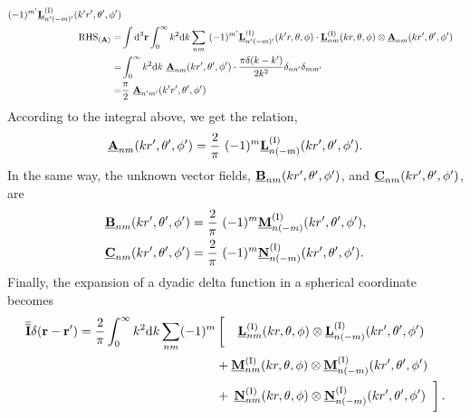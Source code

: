 \documentclass[journal=jacsat,manuscript=article,layout=traditional]{achemso}
\newcommand*\tensori{\overline{\overline{\mathbf{I}}}}
\newcommand{\norF}[1]{\underline{\vb{#1}}}
\newcommand{\RomanI}{\scriptsize\textrm{I}}
\begin{document}
\begin{appendix}
\begin{align}
    (-1)^{m'}\norF{L}_{n'(-m)'}^{(\RomanI)}(k'r',\theta',\phi')\\
    \nonumber
    \mathrm{RHS}_{(\vb{A})}=&\int\mathrm{d}^3\vb{r}\int_0^\infty k^2\mathrm{d}k \sum_{nm}~
    (-1)^{m'}\norF{L}_{n'(-m)'}^{(\RomanI)}(k'r,\theta,\phi)\cdot
    \norF{L}_{nm}^{(\RomanI)}(kr,\theta,\phi)
    \otimes\norF{A}_{nm}(kr',\theta',\phi')\\
    \nonumber
    =&\int_0^\infty k^2\mathrm{d}k~
    \norF{A}_{nm}(kr',\theta',\phi')\cdot \frac{\pi\delta(k-k')}{2k^2}\delta_{nn'}\delta_{mm'}\\
    =&\frac{\pi}{2}~\norF{A}_{n'm'}(k'r',\theta',\phi')
\end{align}
According to the integral above, we get the relation,
\begin{align}
    \norF{A}_{nm}(kr',\theta',\phi') = \frac{2}{\pi}~(-1)^{m}\norF{L}_{n(-m)}^{(\RomanI)}(kr',\theta',\phi').
\end{align}
In the same way, the unknown vector fields, $\norF{B}_{nm}(kr',\theta',\phi')$, and $\norF{C}_{nm}(kr',\theta',\phi')$, are
\begin{align}
    \norF{B}_{nm}(kr',\theta',\phi') &= \frac{2}{\pi}~(-1)^{m}\norF{M}_{n(-m)}^{(\RomanI)}(kr',\theta',\phi'),\\
    \norF{C}_{nm}(kr',\theta',\phi') &= \frac{2}{\pi}~(-1)^{m}\norF{N}_{n(-m)}^{(\RomanI)}(kr',\theta',\phi').
\end{align}
Finally, the expansion of a dyadic delta function in a spherical coordinate becomes
\begin{align}
    \nonumber
    \tensori\delta(\vb{r}-\vb{r'})=\frac{2}{\pi}\int_0^\infty k^2\mathrm{d}k
    \sum_{nm}(-1)^m
    &\left[\vphantom{\frac{a^2}{b^2}}\right. \hspace{.268cm}
    \norF{L}_{nm}^{(\RomanI)}(kr,\theta,\phi) \otimes
    \norF{L}_{n(-m)}^{(\RomanI)}(kr',\theta',\phi')\\
    \nonumber
    &+\norF{M}_{nm}^{(\RomanI)}(kr,\theta,\phi) \otimes
    \norF{M}_{n(-m)}^{(\RomanI)}(kr',\theta',\phi')\\
    &+\hspace{.08cm}\norF{N}_{nm}^{(\RomanI)}(kr,\theta,\phi) \otimes
    \norF{N}_{n(-m)}^{(\RomanI)}(kr',\theta',\phi')
    \hspace{.1cm}\left.\vphantom{\frac{a^2}{b^2}}\right].
\end{align}
\newpage


\end{appendix}
\end{document}
